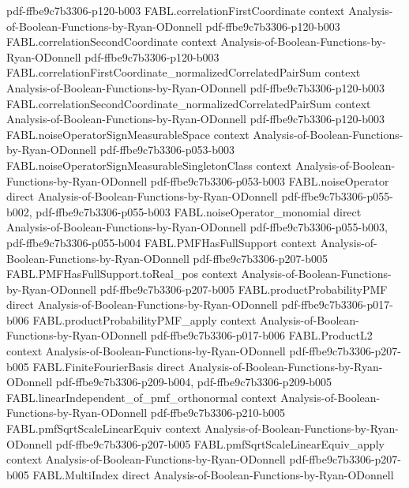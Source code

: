 \begin{theorem}
  {pdf-ffbe9c7b3306-p120-b003}
\proofstep
  {FABL.correlationFirstCoordinate}
  {context}
  {Analysis-of-Boolean-Functions-by-Ryan-ODonnell}
  {pdf-ffbe9c7b3306-p120-b003}
\proofstep
  {FABL.correlationSecondCoordinate}
  {context}
  {Analysis-of-Boolean-Functions-by-Ryan-ODonnell}
  {pdf-ffbe9c7b3306-p120-b003}
\proofstep
  {FABL.correlationFirstCoordinate_normalizedCorrelatedPairSum}
  {context}
  {Analysis-of-Boolean-Functions-by-Ryan-ODonnell}
  {pdf-ffbe9c7b3306-p120-b003}
\proofstep
  {FABL.correlationSecondCoordinate_normalizedCorrelatedPairSum}
  {context}
  {Analysis-of-Boolean-Functions-by-Ryan-ODonnell}
  {pdf-ffbe9c7b3306-p120-b003}
\proofstep
  {FABL.noiseOperatorSignMeasurableSpace}
  {context}
  {Analysis-of-Boolean-Functions-by-Ryan-ODonnell}
  {pdf-ffbe9c7b3306-p053-b003}
\proofstep
  {FABL.noiseOperatorSignMeasurableSingletonClass}
  {context}
  {Analysis-of-Boolean-Functions-by-Ryan-ODonnell}
  {pdf-ffbe9c7b3306-p053-b003}
\proofstep
  {FABL.noiseOperator}
  {direct}
  {Analysis-of-Boolean-Functions-by-Ryan-ODonnell}
  {pdf-ffbe9c7b3306-p055-b002,
    pdf-ffbe9c7b3306-p055-b003}
\proofstep
  {FABL.noiseOperator_monomial}
  {direct}
  {Analysis-of-Boolean-Functions-by-Ryan-ODonnell}
  {pdf-ffbe9c7b3306-p055-b003,
    pdf-ffbe9c7b3306-p055-b004}
\proofstep
  {FABL.PMFHasFullSupport}
  {context}
  {Analysis-of-Boolean-Functions-by-Ryan-ODonnell}
  {pdf-ffbe9c7b3306-p207-b005}
\proofstep
  {FABL.PMFHasFullSupport.toReal_pos}
  {context}
  {Analysis-of-Boolean-Functions-by-Ryan-ODonnell}
  {pdf-ffbe9c7b3306-p207-b005}
\proofstep
  {FABL.productProbabilityPMF}
  {direct}
  {Analysis-of-Boolean-Functions-by-Ryan-ODonnell}
  {pdf-ffbe9c7b3306-p017-b006}
\proofstep
  {FABL.productProbabilityPMF_apply}
  {context}
  {Analysis-of-Boolean-Functions-by-Ryan-ODonnell}
  {pdf-ffbe9c7b3306-p017-b006}
\proofstep
  {FABL.ProductL2}
  {context}
  {Analysis-of-Boolean-Functions-by-Ryan-ODonnell}
  {pdf-ffbe9c7b3306-p207-b005}
\proofstep
  {FABL.FiniteFourierBasis}
  {direct}
  {Analysis-of-Boolean-Functions-by-Ryan-ODonnell}
  {pdf-ffbe9c7b3306-p209-b004,
    pdf-ffbe9c7b3306-p209-b005}
\proofstep
  {FABL.linearIndependent_of_pmf_orthonormal}
  {context}
  {Analysis-of-Boolean-Functions-by-Ryan-ODonnell}
  {pdf-ffbe9c7b3306-p210-b005}
\proofstep
  {FABL.pmfSqrtScaleLinearEquiv}
  {context}
  {Analysis-of-Boolean-Functions-by-Ryan-ODonnell}
  {pdf-ffbe9c7b3306-p207-b005}
\proofstep
  {FABL.pmfSqrtScaleLinearEquiv_apply}
  {context}
  {Analysis-of-Boolean-Functions-by-Ryan-ODonnell}
  {pdf-ffbe9c7b3306-p207-b005}
\proofstep
  {FABL.MultiIndex}
  {direct}
  {Analysis-of-Boolean-Functions-by-Ryan-ODonnell}

\end{theorem}
